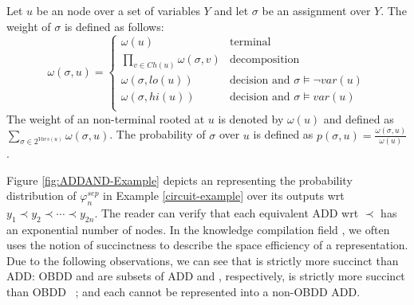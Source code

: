 \begin{definition}\label{def:ADDAND-weight}
	Let $u$ be an \ADDAND node over a set of variables $Y$ and let $\sigma$ be an assignment over $Y$. 
    The weight of $\sigma$ is defined as follows:
	\begin{equation*}
		   \omega(\sigma,u) =  
		   \begin{cases}  
			   \mathit{\omega}(u) & \text{terminal} \\  
				\prod_{v \in Ch(u)}{\omega(\sigma,v)} & \text{decomposition} \\  
	            \omega(\sigma,lo(u)) & \text{decision and $\sigma \models  \lnot \mathit{var}(u)$}  \\
	            \omega(\sigma,hi(u)) & \text{decision and $\sigma \models  \mathit{var}(u)$}  \\
		   \end{cases}
	\end{equation*}
    The weight of an non-terminal \ADDAND rooted at $u$ is denoted by $\omega(u)$ and defined as $\sum_{\sigma \in 2^{\mathit{Vars}(u)}}\omega(\sigma,u)$.
    The probability of $\sigma$ over $u$ is defined as $p(\sigma, u) = \frac{\omega(\sigma,u)}{\omega(u)}$.
\end{definition}


Figure \ref{fig:ADDAND-Example} depicts an \ADDAND representing the probability distribution of $\varphi_n^{sep}$ in Example \ref{circuit-example} over its outputs wrt $y_1 \prec y_2 \prec \cdots \prec y_{2n}$. The reader can verify that each equivalent ADD wrt $\prec$ has an exponential number of nodes.
In the knowledge compilation field \cite{darwiche2002knowledge,fargier2014knowledge}, we often uses the notion of succinctness to describe the space efficiency of a representation. 
Due to the following observations, we can see that \ADDAND is strictly more succinct than ADD: OBDD and \OBDDAND are subsets of ADD and \ADDAND, respectively, \OBDDAND is strictly more succinct than OBDD ~\cite{lai2017new}; and each \OBDDAND cannot be represented into a non-OBDD ADD.





